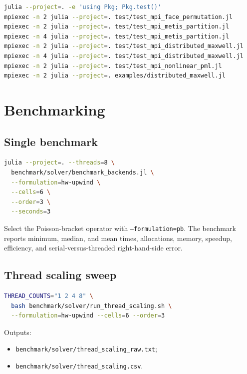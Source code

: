 \documentclass[11pt,oneside]{book}
\newcommand{\code}[1]{\texttt{#1}}
\begin{document}
\begin{lstlisting}[language=bash]
julia --project=. -e 'using Pkg; Pkg.test()'
mpiexec -n 2 julia --project=. test/test_mpi_face_permutation.jl
mpiexec -n 2 julia --project=. test/test_mpi_metis_partition.jl
mpiexec -n 4 julia --project=. test/test_mpi_metis_partition.jl
mpiexec -n 2 julia --project=. test/test_mpi_distributed_maxwell.jl
mpiexec -n 4 julia --project=. test/test_mpi_distributed_maxwell.jl
mpiexec -n 2 julia --project=. test/test_mpi_nonlinear_pml.jl
mpiexec -n 2 julia --project=. examples/distributed_maxwell.jl
\end{lstlisting}

\chapter{Benchmarking}

\section{Single benchmark}

\begin{lstlisting}[language=bash]
julia --project=. --threads=8 \
  benchmark/solver/benchmark_backends.jl \
  --formulation=hw-upwind \
  --cells=6 \
  --order=3 \
  --seconds=3
\end{lstlisting}

Select the Poisson-bracket operator with
\code{--formulation=pb}. The benchmark reports minimum, median, and mean
times, allocations, memory, speedup, efficiency, and serial-versus-threaded
right-hand-side error.

\section{Thread scaling sweep}

\begin{lstlisting}[language=bash]
THREAD_COUNTS="1 2 4 8" \
  bash benchmark/solver/run_thread_scaling.sh \
  --formulation=hw-upwind --cells=6 --order=3
\end{lstlisting}

Outputs:

\begin{itemize}[leftmargin=*]
  \item \code{benchmark/solver/thread\_scaling\_raw.txt};
  \item \code{benchmark/solver/thread\_scaling.csv}.
\end{itemize}
\end{document}
